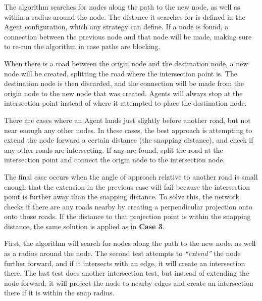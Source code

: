 \begin{CaseEnum}
  \item The algorithm searches for nodes along the path to the new node, as well as within a radius around the node.
  The distance it searches for is defined in the Agent configuration, which any strategy can define.
  If a node is found, a connection between the previous node and that node will be made, making sure to re-run the algorithm in case paths are blocking.

  \item When there is a road between the origin node and the destination node, a new node will be created, splitting the road where the intersection point is.
  The destination node is then discarded, and the connection will be made from the origin node to the new node that was created.
  Agents will always stop at the intersection point instead of where it attempted to place the destination node.

  \item There are cases where an Agent lands just slightly before another road, but not near enough any other nodes.
  In these cases, the best approach is attempting to extend the node forward a certain distance (the snapping distance), and check if any other roads are intersecting.
  If any are found, split the road at the intersection point and connect the origin node to the intersection node.

  \item The final case occurs when the angle of approach relative to another road is small enough that the extension in the previous case will fail because the intersection point is further away than the snapping distance.
  To solve this, the network checks if there are any roads nearby by creating a perpendicular projection onto onto those roads.
  If the distance to that projection point is within the snapping distance, the same solution is applied as in \textbf{Case 3}.
\end{CaseEnum}

First, the algorithm will search for nodes along the path to the new node, as well as a radius around the node.
The second test attempts to \textit{``extend''} the node further forward, and if it intersects with an edge, it will create an intersection there.
The last test does another intersection test, but instead of extending the node forward, it will project the node to nearby edges and create an intersection there if it is within the snap radius.


